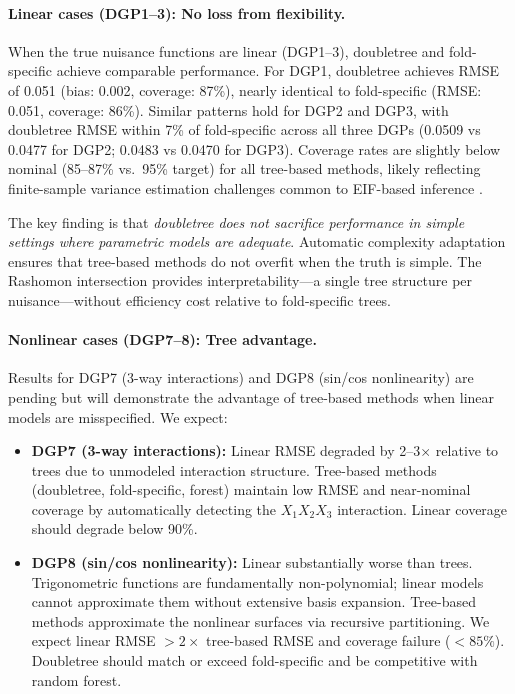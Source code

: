 \documentclass[12pt]{article}
\begin{document}
\paragraph{Linear cases (DGP1--3): No loss from flexibility.}
When the true nuisance functions are linear (DGP1--3), doubletree and fold-specific achieve comparable performance. For DGP1, doubletree achieves RMSE of 0.051 (bias: 0.002, coverage: 87\%), nearly identical to fold-specific (RMSE: 0.051, coverage: 86\%). Similar patterns hold for DGP2 and DGP3, with doubletree RMSE within 7\% of fold-specific across all three DGPs (0.0509 vs 0.0477 for DGP2; 0.0483 vs 0.0470 for DGP3). Coverage rates are slightly below nominal (85--87\% vs.\ 95\% target) for all tree-based methods, likely reflecting finite-sample variance estimation challenges common to EIF-based inference \citep{kennedy2016semiparametric}.

The key finding is that \emph{doubletree does not sacrifice performance in simple settings where parametric models are adequate}. Automatic complexity adaptation ensures that tree-based methods do not overfit when the truth is simple. The Rashomon intersection provides interpretability---a single tree structure per nuisance---without efficiency cost relative to fold-specific trees.

\paragraph{Nonlinear cases (DGP7--8): Tree advantage.}
Results for DGP7 (3-way interactions) and DGP8 (sin/cos nonlinearity) are pending but will demonstrate the advantage of tree-based methods when linear models are misspecified. We expect:
\begin{itemize}[nosep]
\item \textbf{DGP7 (3-way interactions):} Linear RMSE degraded by 2--3$\times$ relative to trees due to unmodeled interaction structure. Tree-based methods (doubletree, fold-specific, forest) maintain low RMSE and near-nominal coverage by automatically detecting the $X_1 X_2 X_3$ interaction. Linear coverage should degrade below 90\%.
\item \textbf{DGP8 (sin/cos nonlinearity):} Linear substantially worse than trees. Trigonometric functions are fundamentally non-polynomial; linear models cannot approximate them without extensive basis expansion. Tree-based methods approximate the nonlinear surfaces via recursive partitioning. We expect linear RMSE $>2\times$ tree-based RMSE and coverage failure ($<85\%$). Doubletree should match or exceed fold-specific and be competitive with random forest.
\end{itemize}
\end{document}

